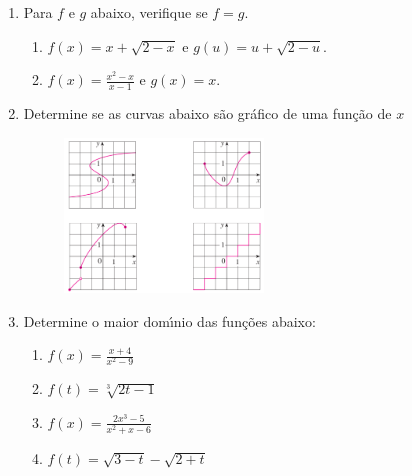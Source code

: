 \documentclass[a4paper,5pt]{amsbook}
\begin{document}
\vspace{1cm}
\begin{enumerate}
    \vspace{0.5cm}
    \item Para $f$ e $g$ abaixo, verifique se $f=g$.
        \begin{enumerate}
            \vspace{0.3cm}
            \item $f(x)=x+\sqrt{2-x}$ e $g(u)=u+\sqrt{2-u}$.
            \vspace{0.3cm}
            \item $f(x)=\displaystyle \frac{x^2-x}{x-1}$ e $g(x)=x$.
        \end{enumerate}

    \vspace{0.5cm}
    \item Determine se as curvas abaixo s\~ao gr\'afico de uma fun\c{c}\~ao de $x$
        \begin{figure}[h]
            \centering
            \includegraphics[width=0.5\textwidth]{lista-00-fig1.png}
        \end{figure}

    \vspace{0.5cm}
    \item Determine o maior dom\'{\i}nio das fun\c{c}\~oes abaixo:
        \begin{enumerate}
            \vspace{0.3cm}
            \item $\displaystyle f(x)=\frac{x+4}{x^2-9}$
            \vspace{0.3cm}
            \item $f(t)=\sqrt[3]{2t-1}$
            \vspace{0.3cm}
            \item $f(x)=\displaystyle\frac{2x^3-5}{x^2+x-6}$
            \vspace{0.3cm}
            \item $f(t)=\sqrt{3-t}-\sqrt{2+t}$
        \end{enumerate}


\end{enumerate}
\end{document}
